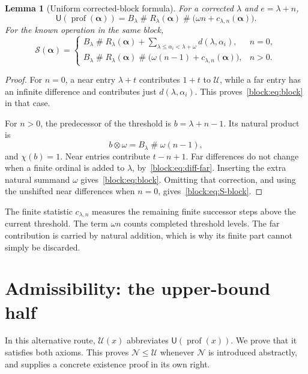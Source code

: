 \documentclass[11pt,a4paper]{article}
\newtheorem{lemma}[theorem]{Lemma}
\theoremstyle{definition}
\newcommand{\ns}{\mathbin{\#}}
\newcommand{\nprod}{\mathbin{\otimes}}
\newcommand{\OpN}{\mathcal N}
\newcommand{\OpS}{\mathcal S}
\newcommand{\FunU}{\mathsf U}
\newcommand{\prof}{\operatorname{prof}}
\newcommand{\seq}[1]{\boldsymbol{#1}}
\newcommand{\diff}[2]{d(#1,#2)}
\begin{document}
\begin{lemma}[Uniform corrected-block formula]\label{block:lem:block}
For a corrected $\lambda$ and $e=\lambda+n$,
\begin{equation}\label{block:eq:block}
 \FunU(\prof(\seq\alpha))=B_\lambda\ns R_\lambda(\seq\alpha)
             \ns\bigl(\omega n+c_{\lambda,n}(\seq\alpha)\bigr).
\end{equation}
For the known operation in the same block,
\begin{equation}\label{block:eq:S-block}
\OpS(\seq\alpha)=
\begin{cases}
 B_\lambda\ns R_\lambda(\seq\alpha)
       +\displaystyle\sum_{\lambda\le\alpha_i<\lambda+\omega}
          \diff\lambda{\alpha_i}, &n=0,\\[4pt]
 B_\lambda\ns R_\lambda(\seq\alpha)
       \ns\bigl(\omega(n-1)+c_{\lambda,n}(\seq\alpha)\bigr), &n>0.
\end{cases}
\end{equation}
\end{lemma}
\begin{proof}
For $n=0$, a near entry $\lambda+t$ contributes $1+t$ to $\mathcal U$, while a far entry has an infinite difference and contributes just $\diff\lambda{\alpha_i}$. This proves~\eqref{block:eq:block} in that case.

For $n>0$, the predecessor of the threshold is $b=\lambda+n-1$. Its natural product is
\[
 b\nprod\omega=B_\lambda\ns\omega(n-1),
\]
and $\chi(b)=1$. Near entries contribute $t-n+1$. Far differences do not change when a finite ordinal is added to $\lambda$, by~\eqref{block:eq:diff-far}. Inserting the extra natural summand $\omega$ gives~\eqref{block:eq:block}. Omitting that correction, and using the unshifted near differences when $n=0$, gives~\eqref{block:eq:S-block}.
\end{proof}

The finite statistic $c_{\lambda,n}$ measures the remaining finite successor steps above the current threshold. The term $\omega n$ counts completed threshold levels. The far contribution is carried by natural addition, which is why its finite part cannot simply be discarded.

\section{Admissibility: the upper-bound half}\label{block:sec:upper}

In this alternative route, $\mathcal U(x)$ abbreviates $\FunU(\prof(x))$. We prove that it satisfies both axioms. This proves $\OpN\le\mathcal U$ whenever $\OpN$ is introduced abstractly, and supplies a concrete existence proof in its own right.
\end{document}
